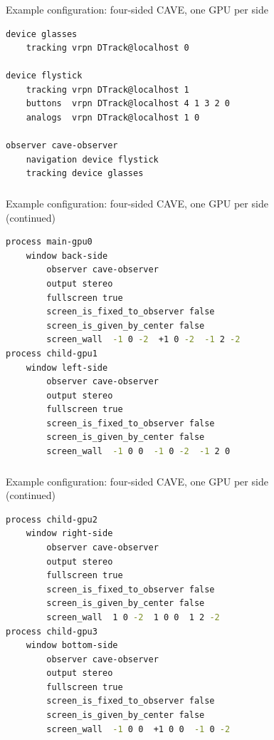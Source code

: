 \documentclass[utf8,stillsansserifmath,fleqn,t]{beamer}
\begin{document}
\begin{frame}[fragile]
\frametitle{\insertsection}
Example configuration: four-sided CAVE, one GPU per side
\begin{lstlisting}[language=sh]
device glasses
    tracking vrpn DTrack@localhost 0

device flystick
    tracking vrpn DTrack@localhost 1
    buttons  vrpn DTrack@localhost 4 1 3 2 0
    analogs  vrpn DTrack@localhost 1 0

observer cave-observer
    navigation device flystick
    tracking device glasses
\end{lstlisting}
\end{frame}
\begin{frame}[fragile]
\frametitle{\insertsection}
Example configuration: four-sided CAVE, one GPU per side\\
(continued)
\begin{lstlisting}[language=sh]
process main-gpu0
    window back-side
        observer cave-observer
        output stereo
        fullscreen true
        screen_is_fixed_to_observer false
        screen_is_given_by_center false
        screen_wall  -1 0 -2  +1 0 -2  -1 2 -2
process child-gpu1
    window left-side
        observer cave-observer
        output stereo
        fullscreen true
        screen_is_fixed_to_observer false
        screen_is_given_by_center false
        screen_wall  -1 0 0  -1 0 -2  -1 2 0
\end{lstlisting}
\end{frame}
\begin{frame}[fragile]
\frametitle{\insertsection}
Example configuration: four-sided CAVE, one GPU per side\\
(continued)
\begin{lstlisting}[language=sh]
process child-gpu2
    window right-side
        observer cave-observer
        output stereo
        fullscreen true
        screen_is_fixed_to_observer false
        screen_is_given_by_center false
        screen_wall  1 0 -2  1 0 0  1 2 -2
process child-gpu3
    window bottom-side
        observer cave-observer
        output stereo
        fullscreen true
        screen_is_fixed_to_observer false
        screen_is_given_by_center false
        screen_wall  -1 0 0  +1 0 0  -1 0 -2
\end{lstlisting}
\end{frame}
\end{document}
